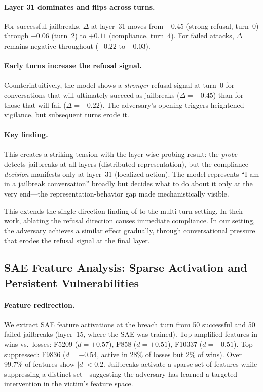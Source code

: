 \documentclass[11pt]{article}
\begin{document}
\paragraph{Layer 31 dominates and flips across turns.}
For successful jailbreaks, $\Delta$ at layer~31 moves from $-0.45$ (strong refusal, turn~0) through $-0.06$ (turn~2) to $+0.11$ (compliance, turn~4).
For failed attacks, $\Delta$ remains negative throughout ($-0.22$ to $-0.03$).

\paragraph{Early turns increase the refusal signal.}
Counterintuitively, the model shows a \emph{stronger} refusal signal at turn~0 for conversations that will ultimately succeed as jailbreaks ($\Delta = -0.45$) than for those that will fail ($\Delta = -0.22$).
The adversary's opening triggers heightened vigilance, but subsequent turns erode it.

\paragraph{Key finding.}
This creates a striking tension with the layer-wise probing result: the \emph{probe} detects jailbreaks at all layers (distributed representation), but the compliance \emph{decision} manifests only at layer~31 (localized action).
The model represents ``I am in a jailbreak conversation'' broadly but decides what to do about it only at the very end---the representation-behavior gap made mechanistically visible.

This extends the single-direction finding of \citet{arditi2024refusal} to the multi-turn setting.
In their work, ablating the refusal direction causes immediate compliance.
In our setting, the adversary achieves a similar effect gradually, through conversational pressure that erodes the refusal signal at the final layer.

\subsection{SAE Feature Analysis: Sparse Activation and Persistent Vulnerabilities}
\label{sec:sae}

\paragraph{Feature redirection.}
We extract SAE feature activations at the breach turn from 50 successful and 50 failed jailbreaks (layer~15, where the SAE was trained).
Top amplified features in wins vs.\ losses: F5209 ($d=+0.57$), F858 ($d=+0.51$), F10337 ($d=+0.51$).
Top suppressed: F9836 ($d=-0.54$, active in 28\% of losses but 2\% of wins).
Over 99.7\% of features show $|d| < 0.2$.
Jailbreaks activate a sparse set of features while suppressing a distinct set---suggesting the adversary has learned a targeted intervention in the victim's feature space.
\end{document}

